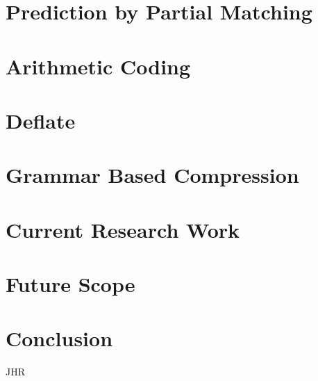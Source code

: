 \documentclass{article}
\begin{document}
\section{Prediction by Partial Matching}

\section{Arithmetic Coding}

\section{Deflate}

\section{Grammar Based Compression}

\section{Current Research Work}

\section{Future Scope}

\section{Conclusion}
JHR \\



\end{document}
